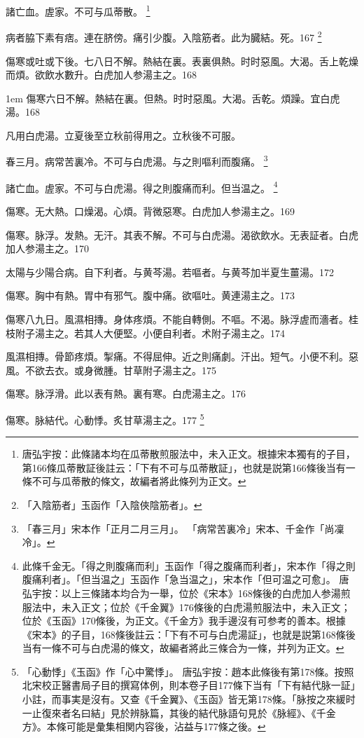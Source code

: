 諸亡血。虗家。不可与瓜蒂散。
	\footnote{
		唐弘宇按：此條諸本均在瓜蒂散煎服法中，未入正文。根據宋本獨有的子目，第166條瓜蒂散証後註云：「下有不可与瓜蒂散証」，也就是説第166條後当有一條不可与瓜蒂散的條文，故編者將此條列为正文。
	}

病者脇下素有痞。連在脐傍。痛引少腹。入陰筋者。此为臓結。死。167
	\footnote{「入陰筋者」玉函作「入陰俠陰筋者」。}

傷寒或吐或下後。七八日不解。熱結在裏。表裏俱熱。时时惡風。大渴。舌上乾燥而煩。欲飲水數升。白虎{\khaaitp 加人参}湯主之。168

\hangindent 1em
傷寒六日不解。熱結在裏。但熱。时时惡風。大渴。舌乾。煩躁。宜白虎湯。{\gaoben}168

凡用白虎湯。立夏後至立秋前得用之。立秋後不可服。

春三月。病常苦裏冷。不可与白虎湯。与之則嘔利而腹痛。
	\footnote{
		「春三月」宋本作「正月二月三月」。
		「病常苦裏冷」宋本、千金作「尚凜冷」。
	}

諸亡血。虗家。不可与白虎湯。得之則腹痛而利。但当温之。
	\footnote{
		此條千金无。「得之則腹痛而利」玉函作「得之腹痛而利者」，宋本作「得之則腹痛利者」。「但当温之」玉函作「急当温之」，宋本作「但可温之可愈」。
		唐弘宇按：以上三條諸本均合为一舉，位於《宋本》168條後的白虎加人参湯煎服法中，未入正文；位於《千金翼》176條後的白虎湯煎服法中，未入正文；位於《玉函》170條後，为正文。《千金方》我手邊沒有可参考的善本。根據《宋本》的子目，168條後註云：「下有不可与白虎湯証」，也就是説第168條後当有一條不可与白虎湯的條文，故編者將此三條合为一條，并列为正文。
	}

傷寒。无大熱。口燥渴。心煩。背微惡寒。白虎{\khaaitp 加人参}湯主之。169

傷寒。脉浮。发熱。无汗。其表不解。不可与白虎湯。渴欲飲水。无表証者。白虎{\khaaitp 加人参}湯主之。170

太陽与少陽合病。自下利者。与黄芩湯。若嘔者。与黄芩加半夏生薑湯。172

傷寒。胸中有熱。胃中有邪气。腹中痛。欲嘔吐。黄連湯主之。173

傷寒八九日。風濕相摶。身体疼煩。不能自轉側。不嘔。不渴。脉浮虗而濇者。桂枝附子湯主之。若其人大便堅。小便自利者。术附子湯主之。174

風濕相摶。骨節疼煩。掣痛。不得屈伸。近之則痛劇。汗出。短气。小便不利。惡風。不欲去衣。或身微腫。甘草附子湯主之。175

傷寒。脉浮滑。此以表有熱。裏有寒。白虎湯主之。176

傷寒。脉結代。心動悸。炙甘草湯主之。177
	\footnote{
		「心動悸」《玉函》作「心中驚悸」。
		唐弘宇按：趙本此條後有第178條。按照北宋校正醫書局子目的撰寫体例，則本卷子目177條下当有「下有結代脉一証」小註，而事実是沒有。又查《千金翼》、《玉函》皆无第178條。「脉按之來緩时一止復來者名曰結」見於辨脉篇，其後的結代脉語句見於《脉經》、《千金方》。本條可能是彙集相関内容後，沾益与177條之後。
		}

